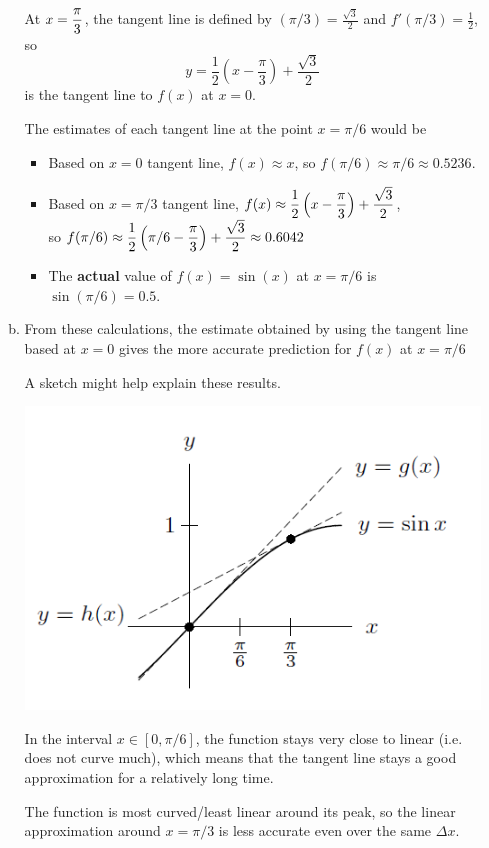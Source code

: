 \begin{enumerate}[1.]
\begin{multicols}{2}
\begin{Solution}
\begin{enumerate}[(a)]
  At $\displaystyle x=\frac{\pi}{3}$, the tangent line is defined by 
$(\pi/3) = \frac{\sqrt{3}}{2}$ and $f'(\pi/3) = \frac{1}{2}$, so 
$$y = \frac{1}{2}\left(x-\frac{\pi}{3}\right) + \frac{\sqrt{3}}{2}$$
is the tangent line to $f(x)$ at $x=0$.

The estimates of each tangent line at the point $x=\pi/6$ would be
\begin{itemize}
\item Based on $x=0$ tangent line, $f(x) \approx x$, so $f(\pi/6) \approx
  \pi/6 \approx 0.5236 $.
\item Based on $x=\pi/3$ tangent line,
$\displaystyle f(x) \approx  \frac{1}{2}\left(x-\frac{\pi}{3}\right) + \frac{\sqrt{3}}{2}$, \\
so 
$\displaystyle f(\pi/6) \approx  \frac{1}{2}\left(\pi/6-\frac{\pi}{3}\right) + \frac{\sqrt{3}}{2} \approx 0.6042 $
\item The {\bf actual} value of $f(x) = \sin(x)$ at $x= \pi/6$ is
  $\sin(\pi/6) = 0.5$. 
\end{itemize}
\item From these calculations, the estimate obtained by using the
  tangent line based at $x=0$ gives the more accurate prediction for
  $f(x)$ at $x=\pi/6$

A sketch might help explain these results.

\includegraphics[width=0.8\linewidth]{graphics/Week02_TangentLines/Sine_tangents}

In the interval $x \in [0, \pi/6]$, the function stays very close to
linear (i.e. does not curve much), which means that the tangent
line stays a good approximation for a relatively long time.

The function is most curved/least linear around its peak, so the
linear approximation around $x = \pi/3$ is less accurate even over the
same $\Delta x$.
    \end{enumerate}


\end{Solution}
\end{multicols}
\end{enumerate}
